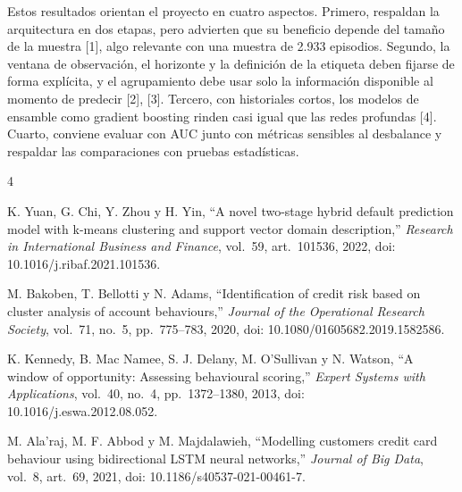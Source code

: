 \documentclass[journal]{IEEEtran}
\begin{document}
Estos resultados orientan el proyecto en cuatro aspectos. Primero, respaldan la arquitectura en dos etapas, pero advierten que su beneficio depende del tamaño de la muestra [1], algo relevante con una muestra de 2.933 episodios. Segundo, la ventana de observación, el horizonte y la definición de la etiqueta deben fijarse de forma explícita, y el agrupamiento debe usar solo la información disponible al momento de predecir [2], [3]. Tercero, con historiales cortos, los modelos de ensamble como gradient boosting rinden casi igual que las redes profundas [4]. Cuarto, conviene evaluar con AUC junto con métricas sensibles al desbalance y respaldar las comparaciones con pruebas estadísticas.

\begin{thebibliography}{4}

K. Yuan, G. Chi, Y. Zhou y H. Yin, ``A novel two-stage hybrid default prediction model with k-means clustering and support vector domain description,'' \emph{Research in International Business and Finance}, vol.~59, art.~101536, 2022, doi: 10.1016/j.ribaf.2021.101536.

M. Bakoben, T. Bellotti y N. Adams, ``Identification of credit risk based on cluster analysis of account behaviours,'' \emph{Journal of the Operational Research Society}, vol.~71, no.~5, pp.~775--783, 2020, doi: 10.1080/01605682.2019.1582586.

K. Kennedy, B. Mac Namee, S. J. Delany, M. O'Sullivan y N. Watson, ``A window of opportunity: Assessing behavioural scoring,'' \emph{Expert Systems with Applications}, vol.~40, no.~4, pp.~1372--1380, 2013, doi: 10.1016/j.eswa.2012.08.052.

M. Ala'raj, M. F. Abbod y M. Majdalawieh, ``Modelling customers credit card behaviour using bidirectional LSTM neural networks,'' \emph{Journal of Big Data}, vol.~8, art.~69, 2021, doi: 10.1186/s40537-021-00461-7.

\end{thebibliography}
\end{document}

